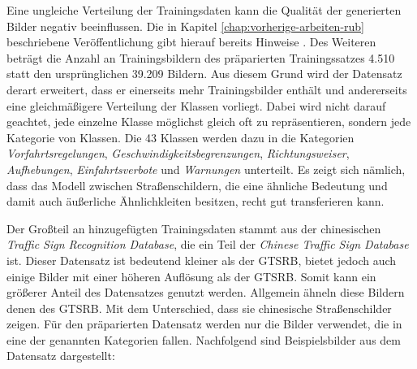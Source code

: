 Eine ungleiche Verteilung der Trainingsdaten kann die Qualität der generierten Bilder negativ beeinflussen. Die in Kapitel \ref{chap:vorherige-arbeiten-rub} beschriebene Veröffentlichung gibt hierauf bereits Hinweise \cite{gtsrbGAN}. Des Weiteren beträgt die Anzahl an Trainingsbildern des präparierten Trainingssatzes 4.510 statt den ursprünglichen 39.209 Bildern. Aus diesem Grund wird der Datensatz derart erweitert, dass er einerseits mehr Trainingsbilder enthält und andererseits eine gleichmäßigere Verteilung der Klassen vorliegt. Dabei wird nicht darauf geachtet, jede einzelne Klasse möglichst gleich oft zu repräsentieren, sondern jede Kategorie von Klassen. Die 43 Klassen werden dazu in die Kategorien \emph{Vorfahrtsregelungen}, \emph{Geschwindigkeitsbegrenzungen}, \emph{Richtungsweiser}, \emph{Aufhebungen}, \emph{Einfahrtsverbote} und \emph{Warnungen} unterteilt. Es zeigt sich nämlich, dass das Modell zwischen Straßenschildern, die eine ähnliche Bedeutung und damit auch äußerliche Ähnlichkleiten besitzen, recht gut transferieren kann. 

Der Großteil an hinzugefügten Trainingsdaten stammt aus der chinesischen \emph{Traffic Sign Recognition Database}, die ein Teil der \emph{Chinese Traffic Sign Database} ist. Dieser Datensatz ist bedeutend kleiner als der \ac{GTSRB}, bietet jedoch auch einige Bilder mit einer höheren Auflösung als der \ac{GTSRB}. Somit kann ein größerer Anteil des Datensatzes genutzt werden. Allgemein ähneln diese Bildern denen des \ac{GTSRB}. Mit dem Unterschied, dass sie chinesische Straßenschilder zeigen. Für den präparierten Datensatz werden nur die Bilder verwendet, die in eine der genannten Kategorien fallen. Nachfolgend sind Beispielsbilder aus dem Datensatz dargestellt: \cite{chinese-dataset}

